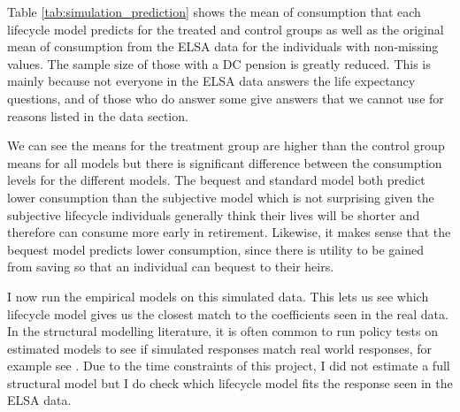 \documentclass[12pt]{article}
\begin{document}


Table \ref{tab:simulation_prediction} shows the mean of consumption that each
lifecycle model predicts for the treated and control groups as well as the
original mean of consumption from the ELSA data for the individuals with
non-missing values. The sample size of those with a DC pension is greatly
reduced. This is mainly because not everyone in the ELSA data answers the life
expectancy questions, and of those who do answer some give answers that we cannot
use for reasons listed in the data section.

We can see the means for the treatment group are higher than the control group
means for all models but there is significant difference between the consumption
levels for the different models. The bequest and standard model both predict
lower consumption than the subjective model which is not surprising given the
subjective lifecycle individuals generally think their lives will be shorter and
therefore can consume more early in retirement. Likewise, it makes sense that
the bequest model predicts lower consumption, since there is utility to be
gained from saving so that an individual can bequest to their heirs.


I now run the empirical models on this simulated data. This lets us see which
lifecycle model gives us the closest match to the coefficients seen in the real
data. In the structural modelling literature, it is often common to run policy
tests on estimated models to see if simulated responses match real world
responses, for example see \cite{mcgee_2021}. Due to the time constraints of
this project, I did not estimate a full structural model but I do check which
lifecycle model fits the response seen in the ELSA data.


\begin{landscape}
    \linespread{1.25}

    
\end{landscape}

\begin{landscape}
    \linespread{1.25}

    
\end{landscape}

\begin{landscape}
    \linespread{1.25}

    
\end{landscape}
\end{document}
